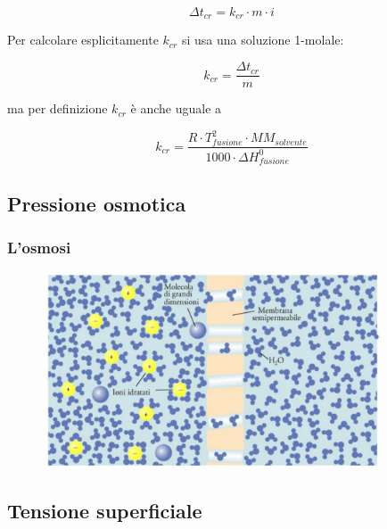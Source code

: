 $$\Delta t_{cr}=k_{cr} \cdot m \cdot i$$

Per calcolare esplicitamente $k_{cr}$ si usa una soluzione 1-molale:

$$k_{cr} = \frac{\Delta t_{cr}}{m}$$

ma per definizione $k_{cr}$ è anche uguale a

$$k_{cr}=\frac{R \cdot T_{fusione}^2 \cdot MM_{solvente}}{1000 \cdot \Delta H^0_{fusione}}$$

\subsection{Pressione osmotica}
\subsubsection{L'osmosi}

\begin{figure}[htp]
    \centering
    \includegraphics[width=10cm]{immagini/osmosi.png}
\end{figure}

\subsection{Tensione superficiale}